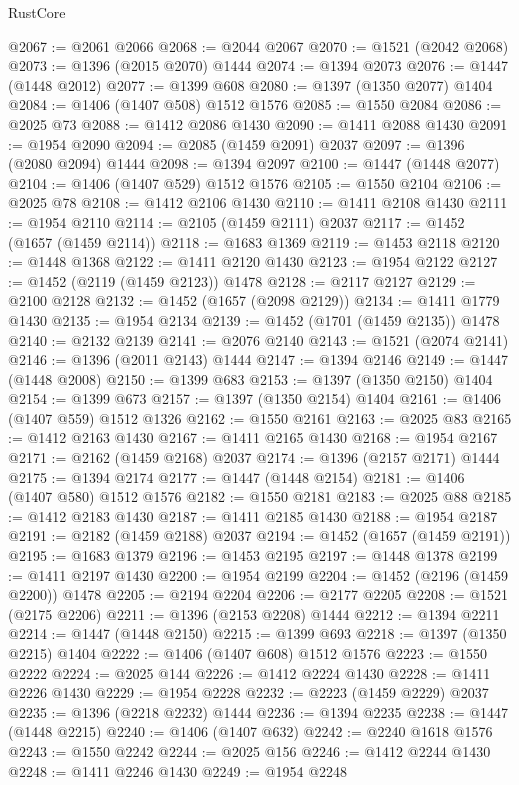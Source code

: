 \begin{lexlean}{RustCore}
\begin{coremodule}
@2067 := @2061 @2066
@2068 := @2044 @2067
@2070 := @1521 (@2042 @2068)
@2073 := @1396 (@2015 @2070) @1444
@2074 := @1394 @2073
@2076 := @1447 (@1448 @2012)
@2077 := @1399 @608
@2080 := @1397 (@1350 @2077) @1404
@2084 := @1406 (@1407 @508) @1512 @1576
@2085 := @1550 @2084
@2086 := @2025 @73
@2088 := @1412 @2086 @1430
@2090 := @1411 @2088 @1430
@2091 := @1954 @2090
@2094 := @2085 (@1459 @2091) @2037
@2097 := @1396 (@2080 @2094) @1444
@2098 := @1394 @2097
@2100 := @1447 (@1448 @2077)
@2104 := @1406 (@1407 @529) @1512 @1576
@2105 := @1550 @2104
@2106 := @2025 @78
@2108 := @1412 @2106 @1430
@2110 := @1411 @2108 @1430
@2111 := @1954 @2110
@2114 := @2105 (@1459 @2111) @2037
@2117 := @1452 (@1657 (@1459 @2114))
@2118 := @1683 @1369
@2119 := @1453 @2118
@2120 := @1448 @1368
@2122 := @1411 @2120 @1430
@2123 := @1954 @2122
@2127 := @1452 (@2119 (@1459 @2123)) @1478
@2128 := @2117 @2127
@2129 := @2100 @2128
@2132 := @1452 (@1657 (@2098 @2129))
@2134 := @1411 @1779 @1430
@2135 := @1954 @2134
@2139 := @1452 (@1701 (@1459 @2135)) @1478
@2140 := @2132 @2139
@2141 := @2076 @2140
@2143 := @1521 (@2074 @2141)
@2146 := @1396 (@2011 @2143) @1444
@2147 := @1394 @2146
@2149 := @1447 (@1448 @2008)
@2150 := @1399 @683
@2153 := @1397 (@1350 @2150) @1404
@2154 := @1399 @673
@2157 := @1397 (@1350 @2154) @1404
@2161 := @1406 (@1407 @559) @1512 @1326
@2162 := @1550 @2161
@2163 := @2025 @83
@2165 := @1412 @2163 @1430
@2167 := @1411 @2165 @1430
@2168 := @1954 @2167
@2171 := @2162 (@1459 @2168) @2037
@2174 := @1396 (@2157 @2171) @1444
@2175 := @1394 @2174
@2177 := @1447 (@1448 @2154)
@2181 := @1406 (@1407 @580) @1512 @1576
@2182 := @1550 @2181
@2183 := @2025 @88
@2185 := @1412 @2183 @1430
@2187 := @1411 @2185 @1430
@2188 := @1954 @2187
@2191 := @2182 (@1459 @2188) @2037
@2194 := @1452 (@1657 (@1459 @2191))
@2195 := @1683 @1379
@2196 := @1453 @2195
@2197 := @1448 @1378
@2199 := @1411 @2197 @1430
@2200 := @1954 @2199
@2204 := @1452 (@2196 (@1459 @2200)) @1478
@2205 := @2194 @2204
@2206 := @2177 @2205
@2208 := @1521 (@2175 @2206)
@2211 := @1396 (@2153 @2208) @1444
@2212 := @1394 @2211
@2214 := @1447 (@1448 @2150)
@2215 := @1399 @693
@2218 := @1397 (@1350 @2215) @1404
@2222 := @1406 (@1407 @608) @1512 @1576
@2223 := @1550 @2222
@2224 := @2025 @144
@2226 := @1412 @2224 @1430
@2228 := @1411 @2226 @1430
@2229 := @1954 @2228
@2232 := @2223 (@1459 @2229) @2037
@2235 := @1396 (@2218 @2232) @1444
@2236 := @1394 @2235
@2238 := @1447 (@1448 @2215)
@2240 := @1406 (@1407 @632)
@2242 := @2240 @1618 @1576
@2243 := @1550 @2242
@2244 := @2025 @156
@2246 := @1412 @2244 @1430
@2248 := @1411 @2246 @1430
@2249 := @1954 @2248

\end{coremodule}
\end{lexlean}
